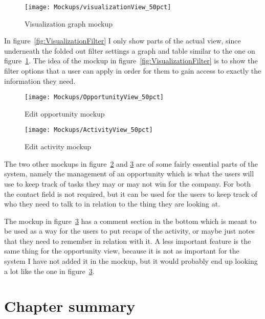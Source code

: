 \begin{figure}
  \centering
  \texttt{[image: Mockups/visualizationView\_50pct]}
  \caption{Visualization graph mockup}
  \label{fig:VisualizationView}
\end{figure}

In figure~\ref{fig:VisualizationFilter} I only show parts  of the actual view, since underneath the folded out filter settings a graph and table similar to the one on figure~\ref{fig:VisualizationView}. The idea of the mockup in figure~\ref{fig:VisualizationFilter} is to show the filter options that a user can apply in order for them to gain access to exactly the information they need.

\begin{figure}
  \centering
  \texttt{[image: Mockups/OpportunityView\_50pct]}
  \caption{Edit opportunity mockup}
  \label{fig:OpportunityView}
\end{figure}

\begin{figure}
  \centering
  \texttt{[image: Mockups/ActivityView\_50pct]}
  \caption{Edit activity mockup}
  \label{fig:ActivityView}
\end{figure}

The two other mockups in figure~\ref{fig:OpportunityView} and \ref{fig:ActivityView} are of some fairly essential parts of the system, namely the management of an opportunity which is what the users will use to keep track of tasks they may or may not win for the company. For both the contact field is not required, but it can be used for the users to keep track of who they need to talk to in relation to the thing they are looking at.

The mockup in figure~\ref{fig:ActivityView} has a comment section in the bottom which is meant to be used as a way for the users to put recaps of the activity, or maybe just notes that they need to remember in relation with it. A less important feature is the same thing for the opportunity view, because it is not as important for the system I have not added it in the mockup, but it would probably end up looking a lot like the one in figure~\ref{fig:ActivityView}.

\section{Chapter summary}
